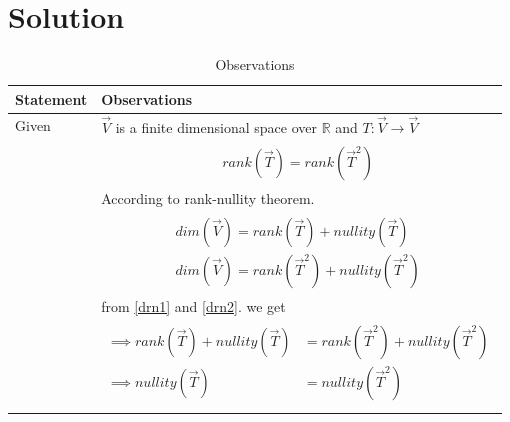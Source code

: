 \documentclass[journal,12pt]{IEEEtran}
\begin{document}
\section{\textbf{Solution}}
\renewcommand{\thetable}{2}
\begin{longtable}{|l|l|}
\hline
\endhead
\textbf{Statement}&\textbf{Observations}\\
\hline
Given&$\vec{V}$ is a finite dimensional space over $\mathbb{R}$ and $T:\vec{V}\rightarrow\vec{V}$\\&\parbox{15cm}{\begin{align}
    rank(\vec{T})=rank(\vec{T}^2)\label{r}
\end{align}}\\&According to rank-nullity theorem.\\&\parbox{15cm}{\begin{align}
    dim(\vec{V})=rank(\vec{T})+nullity(\vec{T})\label{drn1}\\
    dim(\vec{V})=rank(\vec{T}^2)+nullity(\vec{T}^2)\label{drn2}
\end{align}}\\&from \eqref{drn1} and \eqref{drn2}. we get\\&\parbox{15cm}{\begin{align}
    \implies rank(\vec{T})+nullity(\vec{T})&=rank(\vec{T}^2)+nullity(\vec{T}^2)\\
    \implies nullity(\vec{T})&=nullity(\vec{T}^2)\label{n}
\end{align}}\\
\hline
\caption{Observations}
\label{obs}
\end{longtable}
\renewcommand{\thetable}{3}
\end{document}
